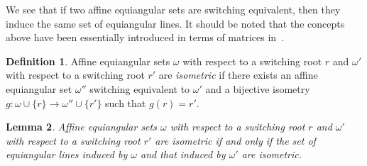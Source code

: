 \documentclass[reqno, 11pt]{amsart}
\numberwithin{equation}{section}
\newtheorem{lem}{Lemma}[section]
\theoremstyle{definition}
\newtheorem{dfn}[lem]{Definition}%
\newcommand{\aes}{\omega}
\begin{document}
We see that if two affine equiangular sets are switching equivalent, then they induce the same set of equiangular lines.
It should be noted that the concepts above have been essentially introduced in terms of matrices in~\cite{cao2021}.

\begin{dfn}
	Affine equiangular sets $\aes$ with respect to a switching root $r$ and $\aes'$ with respect to a switching root $r'$ are \emph{isometric}
	if there exists an affine equiangular set $\aes''$ switching equivalent to $\aes'$ and a bijective isometry $g : \aes \cup \{r \} \to \aes'' \cup \{r' \}$ such that $g(r) = r'$.
\end{dfn}

\begin{lem}	\label{lem:iso}
	Affine equiangular sets $\aes$ with respect to a switching root $r$ and $\aes'$ with respect to a switching root $r'$ are isometric
	if and only if the set of equiangular lines induced by $\aes$ and that induced by $\aes'$ are isometric.
\end{lem}
\end{document}
